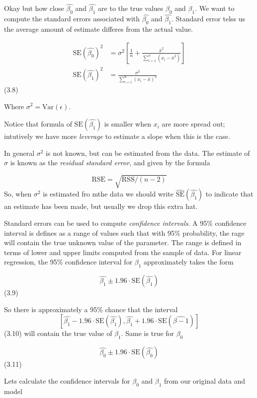 \documentclass[
  letterpaper,
  DIV=11,
  numbers=noendperiod]{scrreprt}
\begin{document}
Okay but how close \(\hat{\beta_0}\) and \(\hat{\beta_1}\) are to the
true values \(\beta_0\) and \(\beta_1\). We want to compute the standard
errors associated with \(\hat{\beta_0}\) and \(\hat{\beta_1}\). Standard
error telss us the average amount of estimate differes from the actual
value.

\[
\begin{align}
\text{SE}(\hat{\beta_0})^2 &= \sigma^2 \left[\frac{1}{n} + \frac{\bar{x}^2}{\sum_{i=1}^n(x_i - \bar{x}^2)}\right] \\
\text{SE}(\hat{\beta_1})^2 &= \frac{\sigma^2}{\sum_{i=1}^n(x_i-\bar{x})^2}
\end{align}
\] (3.8)

Where \(\sigma^2=\text{Var}(\epsilon)\).

Notice that formula of \(\text{SE}(\hat{\beta_1})\) is smaller when
\(x_i\) are more spread out; intutively we have more \emph{leverage} to
estimate a slope when this is the case.

In general \(\sigma^2\) is not known, but can be estimated from the
data. The estimate of \(\sigma\) is known as the \emph{residual standard
error}, and given by the formula

\[
\text{RSE} = \sqrt{\text{RSS}/(n-2)}
\] So, when \(\sigma^2\) is estimated fro mthe data we should write
\(\hat{\text{SE}}(\hat{\beta_1})\) to indicate that an estimate has been
made, but usually we drop this extra hat.

Standard errors can be used to compute \emph{confidence intervals}. A
95\% confidence interval is defines as a range of values such that with
95\% probability, the rage will contain the true unknown value of the
parameter. The range is defined in terms of lower and upper limits
computed from the sample of data. For linear regression, the 95\%
confidence interval for \(\beta_1\) approximately takes the form

\[
\hat{\beta_1} \pm 1.96 \cdot \text{SE}(\hat{\beta_1}) 
\] (3.9)

So there is approximately a 95\% chance that the interval
\[[\hat{\beta_1} - 1.96 \cdot \text{SE}(\hat{\beta_1}), \hat{\beta_1} + 1.96 \cdot \text{SE}(\hat{\beta-1})]\]
(3.10) will contain the true value of \(\beta_1\). Same is true for
\(\beta_0\)

\[
\hat{\beta_0} \pm 1.96 \cdot \text{SE}(\hat{\beta_0})
\] (3.11)

Lets calculate the confidence intervals for \(\beta_0\) and \(\beta_1\)
from our original data and model
\end{document}
